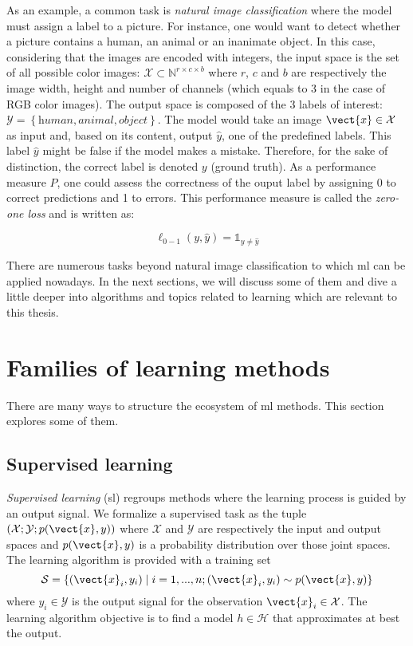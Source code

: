 As an example, a common task is \textit{natural image classification} where the
model must assign a label to a picture. For instance, one would want to detect
whether a picture contains a human, an animal or an inanimate object. In this
case, considering that the images are encoded with integers, the input space is
the set of all possible color images: $\mathcal{X} \subset \mathbb{N}^{r\times c\times b}$
where $r$, $c$ and $b$ are respectively the image width, height and number of
channels (which equals to 3 in the case of RGB color images). The output space
is composed of the 3 labels of interest: $\mathcal{Y} = \left\{\textit{human}, \textit{animal}, \textit{object}\right\}$.
The model would take an image $\vect{x} \in \mathcal{X}$ as input and, based on
its content, output $\hat{y}$, one of the predefined labels. This label $\hat{y}$
might be false if the model makes a mistake. Therefore, for the sake of distinction,
the correct label is denoted $y$ (\aka ground truth). As a performance measure
$P$, one could assess the correctness of the ouput label by assigning 0 to correct
predictions and 1 to errors. This performance measure is called the \textit{zero-one loss}
and is written as:

\begin{equation}
\ell_{0-1}(y, \hat{y}) = \mathbb{1}_{y\neq\hat{y}}
\end{equation}

There are numerous tasks beyond natural image classification to which \acrlong{ml}
can be applied nowadays. In the next sections, we will discuss some of them and
dive a little deeper into algorithms and topics related to learning which are
relevant to this thesis.

\section{Families of learning methods}
\label{sec:backml:families}

There are many ways to structure the ecosystem of \acrlong{ml} methods. This
section explores some of them.

\subsection{Supervised learning}
\label{ssec:backml:sl}

\textit{Supervised learning} (\acrshort{sl}) regroups methods where the learning
process is guided by an output signal. We formalize a supervised task as the tuple
$\left(\mathcal{X}; \mathcal{Y}; p(\vect{x}, y)\right)$ where $\mathcal{X}$ and
$\mathcal{Y}$ are respectively the input and output spaces and $p(\vect{x}, y)$
is a probability distribution over those joint spaces. The learning algorithm is
provided with a training set
\begin{equation}
\label{eqn:backml:supervised}
\mathcal{S} = \left\{(\vect{x}_i, y_i) \mid i = 1,...,n ; (\vect{x}_i, y_i) \sim p(\vect{x}, y) \right\}
\end{equation}
where $y_i \in \mathcal{Y}$ is the output signal for the observation
$\vect{x}_i \in \mathcal{X}$. The learning algorithm objective is to find a model
$h \in \mathcal{H}$ that approximates at best the output.

